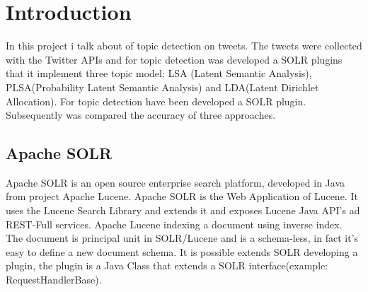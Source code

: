 
\chapter{Introduction}

In this project i talk about of topic detection on tweets. The tweets were collected with the Twitter APIs and for topic detection was developed a SOLR plugins that it implement three topic model: LSA (Latent Semantic Analysis), PLSA(Probability Latent Semantic Analysis) and LDA(Latent Dirichlet Allocation). For topic detection have been developed a SOLR plugin. Subsequently was compared the accuracy of three approaches.

\section{Apache SOLR}

Apache SOLR is an open source enterprise search platform, developed in Java from project Apache Lucene. Apache SOLR is the Web Application of Lucene. It uses the Lucene Search Library and extends it and exposes Lucene Java API's ad REST-Full services. Apache Lucene indexing a document using inverse index. The document is principal unit in SOLR/Lucene and is a schema-less, in fact it's easy to define a new document schema. It is possible extends SOLR developing a plugin, the plugin is a Java Class that extends a SOLR interface(example: RequestHandlerBase).